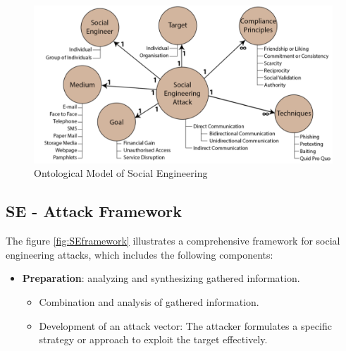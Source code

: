 \begin{figure}[H]
    \centering
    \includegraphics[width=0.7\linewidth]{Images/Sociology/SEonto.png}
    \caption{Ontological Model of Social Engineering}
    \label{fig:SEonto}
\end{figure}

\subsection{SE - Attack Framework}
The figure \ref{fig:SEframework} illustrates a comprehensive framework for social engineering attacks, which includes the following components:
\begin{itemize}
    \item \textbf{Preparation}: analyzing and synthesizing gathered information.
    \begin{itemize}
        \item Combination and analysis of gathered information.
        \item Development of an attack vector: The attacker formulates a specific strategy or approach to exploit the target effectively.
    \end{itemize}
\end{itemize}

